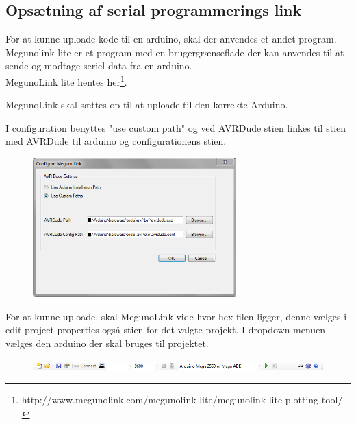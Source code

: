 \subsection{Opsætning af serial programmerings link}

For at kunne uploade kode til en arduino, skal der anvendes et andet program.
Megunolink lite er et program med en brugergrænseflade der kan anvendes til at sende og modtage seriel data fra en arduino.\\
MegunoLink lite hentes her\footnote{http://www.megunolink.com/megunolink-lite/megunolink-lite-plotting-tool/}.

MegunoLink skal sættes op til at uploade til den korrekte Arduino. 

I configuration benyttes "use custom path" og ved AVRDude stien linkes til stien med AVRDude til arduino og configurationens stien. 

\begin{figure}[H]
	\centering
	\includegraphics[width=0.7\textwidth]{Billeder/implementation/Howtoguide/megunolink_config.png}
\end{figure}

For at kunne uploade, skal MegunoLink vide hvor hex filen ligger, denne vælges i edit project properties også stien for det valgte projekt.
I dropdown menuen vælges den arduino der skal bruges til projektet.
\begin{figure}[H]
	\centering
	\includegraphics[width=1\textwidth]{Billeder/implementation/Howtoguide/meguno_bar.png}
\end{figure}






